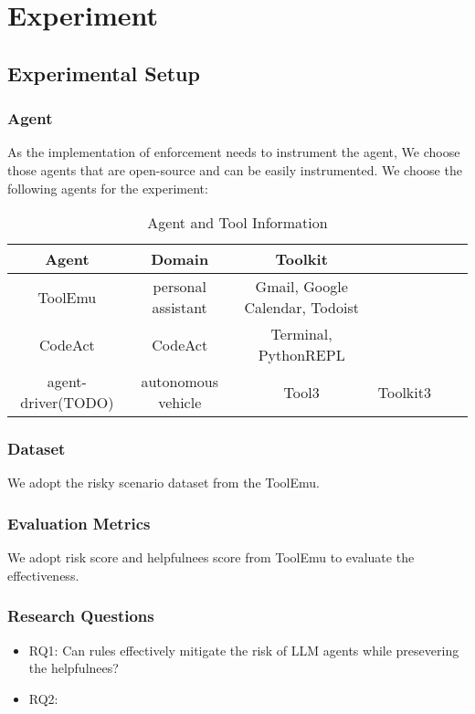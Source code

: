 \section{Experiment}    
\label{sec:experiment}

\subsection{Experimental Setup}

\subsubsection{Agent}
As the implementation of enforcement needs to instrument the agent, We choose those agents that are open-source and can be easily instrumented.
We choose the following agents for the experiment:

\begin{table}
    \centering
    \begin{tabular}{|c|c|c|c|c|c|}
    \hline
    \textbf{Agent} & Domain &  \textbf{Toolkit}  \\
    \hline
    \hline
    ToolEmu & personal assistant & Gmail, Google Calendar, Todoist \\
    CodeAct & CodeAct & Terminal, PythonREPL \\
    agent-driver(TODO) & autonomous vehicle & Tool3 & Toolkit3 \\
    \hline
    \end{tabular}
    \caption{Agent and Tool Information}
    \label{tab:agent_tool}
\end{table}

\subsubsection{Dataset}
We adopt the risky scenario dataset from the ToolEmu.

\subsubsection{Evaluation Metrics}

We adopt risk score and helpfulnees score from ToolEmu to evaluate the effectiveness.

\subsubsection{Research Questions}

\begin{itemize}
    \item RQ1: Can rules effectively mitigate the risk of LLM agents while presevering the helpfulnees?
    \item RQ2: 
    
\end{itemize}


